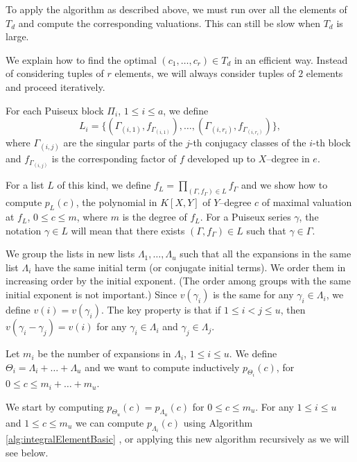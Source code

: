 \documentclass[a4paper,11pt]{amsart}%
\theoremstyle{definition}
\theoremstyle{plain}
\theoremstyle{remark}
\begin{document}
To apply the algorithm as described above, we must run over all the elements
of $T_{d}$ and compute the corresponding valuations. This can still be slow
when $T_{d}$ is large.

We explain how to find the optimal $(c_{1}, \dots, c_{r}) \in T_{d}$ in an
efficient way. Instead of considering tuples of $r$ elements, we will always
consider tuples of $2$ elements and proceed iteratively.

For each Puiseux block $\varPi_{i}$, $1 \leq i \leq a$, we define
\[
L_{i} = \{(\varGamma_{(i,1)}, f_{\varGamma_{(i,1)}}), \dots, (\varGamma_{(i,
r_{i})}, f_{\varGamma_{(i, r_{i})}})\},
\]
where $\varGamma_{(i, j)}$ are the singular parts of the $j$-th conjugacy
classes of the $i$-th block and $f_{\varGamma_{(i, j)}}$ is the corresponding
factor of $f$ developed up to $X$--degree in $e$.

For a list $L$ of this kind, we define $f_{L} = \prod_{(\Gamma, f_{\varGamma})
\in L} f_{\varGamma}$ and we show how to compute $p_{L}(c)$, the polynomial in
$K[X,Y]$ of $Y$--degree $c$ of maximal valuation at $f_{L}$, $0 \leq c \leq
m$, where $m$ is the degree of $f_{L}$. For a Puiseux series $\gamma$, the
notation $\gamma\in L$ will mean that there exists $(\Gamma, f_{\Gamma}) \in
L$ such that $\gamma\in\Gamma$.

We group the lists in new lists $\varLambda_{1}, \dots, \varLambda_{u}$ such
that all the expansions in the same list $\varLambda_{i}$ have the same
initial term (or conjugate initial terms). We order them in increasing order
by the initial exponent. (The order among groups with the same initial
exponent is not important.) Since $v(\gamma_{i})$ is the same for any
$\gamma_{i} \in\varLambda_{i}$, we define $v(i) = v(\gamma_{i})$. The key
property is that if $1 \leq i < j \leq u$, then $v(\gamma_{i} - \gamma_{j}) =
v(i)$ for any $\gamma_{i} \in\varLambda_{i}$ and $\gamma_{j} \in
\varLambda_{j}$.

Let $m_{i}$ be the number of expansions in $\varLambda_{i}$, $1 \leq i \leq
u$. We define $\varTheta_{i} = \varLambda_{i} + \dots+ \varLambda_{u}$ and we
want to compute inductively $p_{\varTheta_{i}}(c)$, for $0 \leq c \leq m_{i} +
\dots+ m_{u}$.

We start by computing $p_{\varTheta_{u}}(c) = p_{\varLambda_{u}}(c)$ for $0
\leq c \leq m_{u}$. For any $1 \leq i \leq u$ and $1 \leq c \leq m_{u}$ we can
compute $p_{\varLambda_{i}}(c)$ using Algorithm \ref{alg:integralElementBasic}%
, or applying this new algorithm recursively as we will see below.
\end{document}
